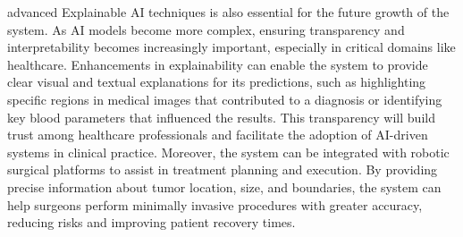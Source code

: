 \documentclass[a4paper,12pt]{report}
\begin{document}
\begin{doublespace}
advanced Explainable AI techniques is also essential for the future growth of the system. As AI models become more complex, ensuring transparency and interpretability becomes increasingly important, especially in critical domains like healthcare. Enhancements in explainability can enable the system to provide clear visual and textual explanations for its predictions, such as highlighting specific regions in medical images that contributed to a diagnosis or identifying key blood parameters that influenced the results. This transparency will build trust among healthcare professionals and facilitate the adoption of AI-driven systems in clinical practice. Moreover, the system can be integrated with robotic surgical platforms to assist in treatment planning and execution. By providing precise information about tumor location, size, and boundaries, the system can help surgeons perform minimally invasive procedures with greater accuracy, reducing risks and improving patient recovery times.

\end{doublespace}
\end{document}
